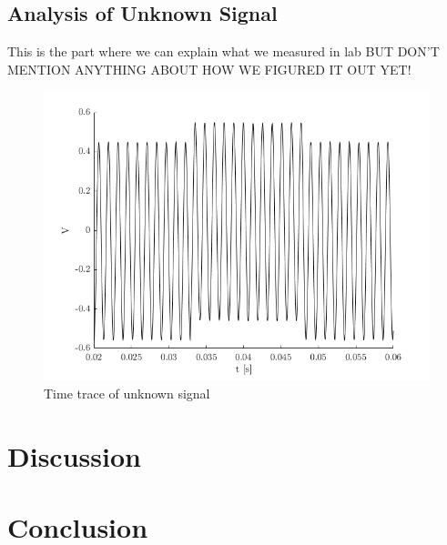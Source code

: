 \documentclass[letterpaper,12pt]{article}
\begin{document}
\subsection{Analysis of Unknown Signal}
This is the part where we can explain what we measured in lab BUT DON'T MENTION ANYTHING ABOUT HOW WE FIGURED IT OUT YET!

\begin{figure}[h!]
    \centering
    \includegraphics[scale=.7 ]{mysteryTime.png}
    \caption{Time trace of unknown signal}
    \label{UnknownTime}
\end{figure}


\section{Discussion}

\section{Conclusion}
\end{document}
